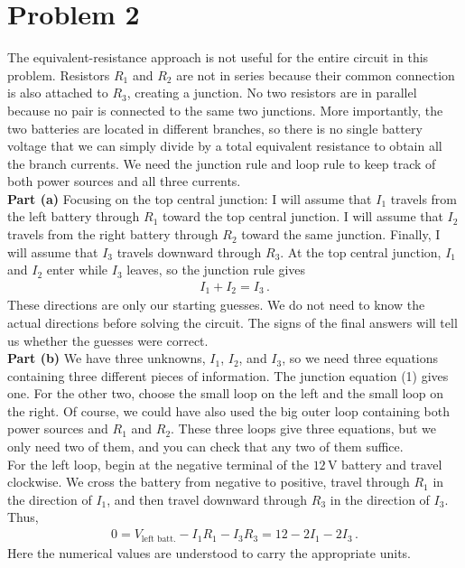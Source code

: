\documentclass[11pt]{article}
\begin{document}
\section*{Problem 2}
The equivalent-resistance approach is not useful for the entire circuit in this problem. Resistors $R_1$ and $R_2$ are not in series because their common connection is also attached to $R_3$, creating a junction. No two resistors are in parallel because no pair is connected to the same two junctions. More importantly, the two batteries are located in different branches, so there is no single battery voltage that we can simply divide by a total equivalent resistance to obtain all the branch currents. We need the junction rule and loop rule to keep track of both power sources and all three currents.\\

\noindent\textbf{Part (a)} Focusing on the top central junction: I will assume that $I_1$ travels from the left battery through $R_1$ toward the top central junction. I will assume that $I_2$ travels from the right battery through $R_2$ toward the same junction. Finally, I will assume that $I_3$ travels downward through $R_3$. At the top central junction, $I_1$ and $I_2$ enter while $I_3$ leaves, so the junction rule gives
\begin{align*}
I_1+I_2=I_3\,. \tag{1}
\end{align*}
These directions are only our starting guesses. We do not need to know the actual directions before solving the circuit. The signs of the final answers will tell us whether the guesses were correct.\\

\noindent\textbf{Part (b)} We have three unknowns, $I_1$, $I_2$, and $I_3$, so we need three equations containing three different pieces of information. The junction equation (1) gives one. For the other two, choose the small loop on the left and the small loop on the right. Of course, we could have also used the big outer loop containing both power sources and $R_1$ and $R_2$. These three loops give three equations, but we only need two of them, and you can check that any two of them suffice. \\

For the left loop, begin at the negative terminal of the $12$\,V battery and travel clockwise. We cross the battery from negative to positive, travel through $R_1$ in the direction of $I_1$, and then travel downward through $R_3$ in the direction of $I_3$. Thus,
\begin{align*}
0=V_{\text{left batt.}}-I_1R_1-I_3R_3=12-2I_1-2I_3\,. \tag{2}
\end{align*}
Here the numerical values are understood to carry the appropriate units.\\
\end{document}
